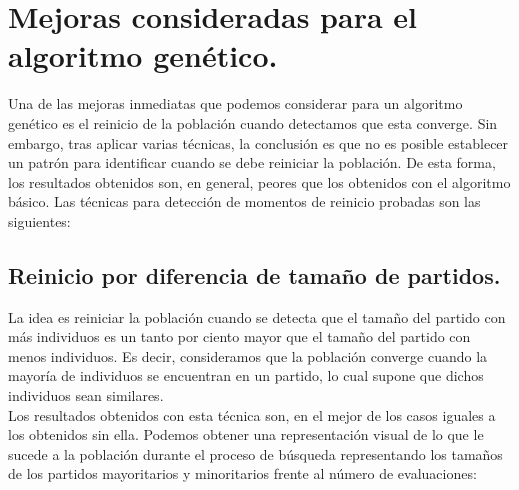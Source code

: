 \documentclass[12pt]{article}
\numberwithin{figure}{section} %
\numberwithin{table}{section} %
\begin{document}
	\section[Mejoras consideradas para el algoritmo genético.]{Mejoras consideradas para el algoritmo genético.}
	
	Una de las mejoras inmediatas que podemos considerar para un algoritmo genético es el reinicio de la población cuando detectamos que esta converge. Sin embargo, tras aplicar varias técnicas, la conclusión es que no es posible establecer un patrón para identificar cuando se debe reiniciar la población. De esta forma, los resultados obtenidos son, en general, peores que los obtenidos con el algoritmo básico. Las técnicas para detección de momentos de reinicio probadas son las siguientes:
	
	\subsection[Reinicio por diferencia de tamaño de partidos.]{Reinicio por diferencia de tamaño de partidos.}
	
	La idea es reiniciar la población cuando se detecta que el tamaño del partido con más individuos es un tanto por ciento mayor que el tamaño del partido con menos individuos. Es decir, consideramos que la población converge cuando la mayoría de individuos se encuentran en un partido, lo cual supone que dichos individuos sean similares. \\
	
	Los resultados obtenidos con esta técnica son, en el mejor de los casos iguales a los obtenidos sin ella. Podemos obtener una representación visual de lo que le sucede a la población durante el proceso de búsqueda representando los tamaños de los partidos mayoritarios y minoritarios frente al número de evaluaciones:
	
\end{document}
